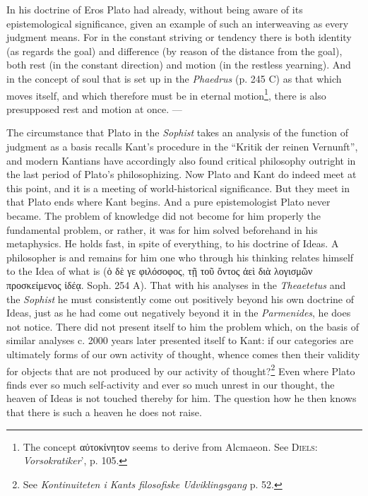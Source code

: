 \documentclass[12pt,a4paper,openany]{book}
\newcommand{\opage}[1]{\marginnote{\footnotesize\textit{[#1]}}}
\begin{document}
\setcounter{footnote}{0}%
\opage{57}In his doctrine of Eros Plato had already, without being
aware of its epistemological significance, given
an example of such an interweaving as every judgment
means.  For in the constant striving or tendency there is
both identity (as regards the goal) and difference (by reason of
the distance from the goal), both rest (in the constant direction)
and motion (in the restless yearning).  And in the concept of
soul that is set up in the \textit{Phaedrus} (p. 245 C) as that which moves
itself, and which therefore must be in eternal motion\footnote[1]{The concept αὐτοκίνητον seems to derive from Alcmaeon.  See \textsc{Diels}: \textit{Vorsokratiker}’, p. 105.}, there is
also presupposed rest and motion at once. ---

The circumstance that Plato in the \textit{Sophist} takes
an analysis of the function of judgment as a basis recalls Kant's
procedure in the ``Kritik der reinen Vernunft'', and modern
Kantians have accordingly also found critical
philosophy outright in the last period of Plato's philosophizing.  Now
Plato and Kant do indeed meet at this point, and it
is a meeting of world-historical significance.  But they meet
in that Plato ends where Kant begins.  And a pure epistemologist
Plato never became.  The problem of knowledge
did not become for him properly the fundamental problem, or rather,
it was for him solved beforehand in his metaphysics.
He holds fast, in spite of everything, to his doctrine of Ideas.  A philosopher is and
remains for him one who through his thinking relates
himself to the Idea of what is (ὁ δὲ γε φιλόσοφος, τῇ τοῦ
ὄντος ἀεὶ διὰ λογισμῶν προσκείμενος ἰδέᾳ. Soph. 254 A).
That with his analyses in the \textit{Theaetetus} and the \textit{Sophist}
he must consistently come out positively beyond his own doctrine of Ideas,
just as he had come out negatively beyond it in the
\textit{Parmenides}, he does not notice.  There did not present itself to
him the problem which, on the basis of similar analyses
\setcounter{footnote}{0}%
\opage{58}c. 2000 years later presented itself to Kant: if our categories
are ultimately forms of our own activity of thought,
whence comes then their validity for objects that
are not produced by our activity of thought?\footnote[1]{See \textit{Kontinuiteten i Kants filosofiske Udviklingsgang} p. 52.}  Even where
Plato finds ever so much self-activity and ever so much
unrest in our thought, the heaven of Ideas is not touched
thereby for him.  The question how he then knows that
there is such a heaven he does not raise.
\end{document}
